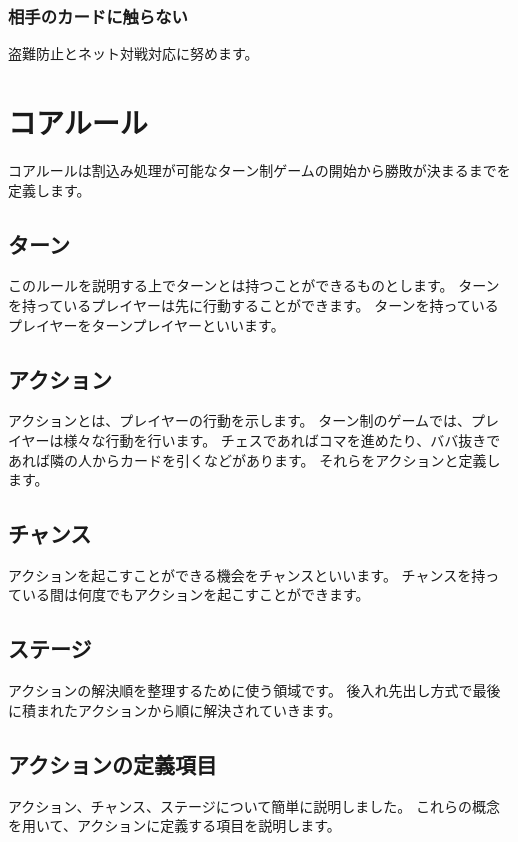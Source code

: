 \documentclass[letterpaper,10pt,dvipdfmx]{sphinxmanual}
\begin{document}
\subsection{相手のカードに触らない}
\label{\detokenize{init/init:id13}}
\sphinxAtStartPar
盗難防止とネット対戦対応に努めます。

\sphinxstepscope


\chapter{コアルール}
\label{\detokenize{core/core:corerule}}\label{\detokenize{core/core:id1}}\label{\detokenize{core/core::doc}}
\sphinxAtStartPar
コアルールは割込み処理が可能なターン制ゲームの開始から勝敗が決まるまでを定義します。


\section{ターン}
\label{\detokenize{core/core:id2}}
\sphinxAtStartPar
このルールを説明する上でターンとは持つことができるものとします。
ターンを持っているプレイヤーは先に行動することができます。
ターンを持っているプレイヤーをターンプレイヤーといいます。


\section{アクション}
\label{\detokenize{core/core:id3}}
\sphinxAtStartPar
アクションとは、プレイヤーの行動を示します。
ターン制のゲームでは、プレイヤーは様々な行動を行います。
チェスであればコマを進めたり、ババ抜きであれば隣の人からカードを引くなどがあります。
それらをアクションと定義します。


\section{チャンス}
\label{\detokenize{core/core:id4}}
\sphinxAtStartPar
アクションを起こすことができる機会をチャンスといいます。
チャンスを持っている間は何度でもアクションを起こすことができます。


\section{ステージ}
\label{\detokenize{core/core:id5}}
\sphinxAtStartPar
アクションの解決順を整理するために使う領域です。
後入れ先出し方式で最後に積まれたアクションから順に解決されていきます。


\section{アクションの定義項目}
\label{\detokenize{core/core:id6}}
\sphinxAtStartPar
アクション、チャンス、ステージについて簡単に説明しました。
これらの概念を用いて、アクションに定義する項目を説明します。
\end{document}
